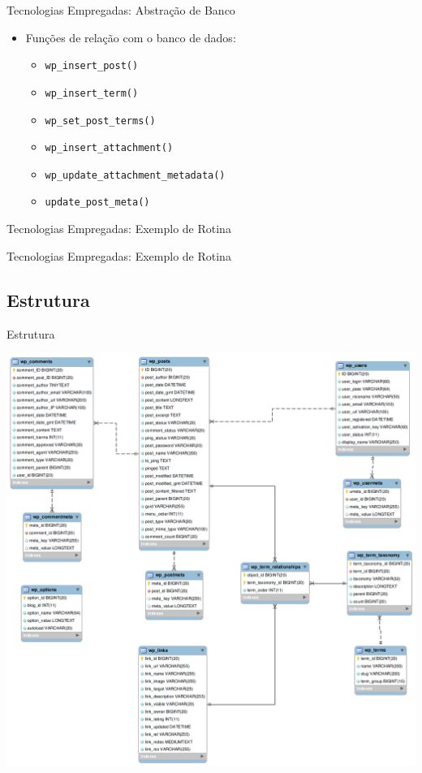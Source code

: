 \documentclass{beamer}
\begin{document}
\begin{frame}{Tecnologias Empregadas: Abstração de Banco}
    \begin{itemize}
    \pause \item Funções de relação com o banco de dados:
    \begin{itemize}
      \pause \item \texttt{wp\_insert\_post()}
      \pause \item \texttt{wp\_insert\_term()}
      \pause \item \texttt{wp\_set\_post\_terms()}
      \pause \item \texttt{wp\_insert\_attachment()}
      \pause \item \texttt{wp\_update\_attachment\_metadata()}
      \pause \item \texttt{update\_post\_meta()}
    \end{itemize}
  \end{itemize}
\end{frame}

\begin{frame}{Tecnologias Empregadas: Exemplo de Rotina}
  
\end{frame}

\begin{frame}{Tecnologias Empregadas: Exemplo de Rotina}
  
\end{frame}

\subsection{Estrutura}

\begin{frame}{Estrutura}
  \begin{center}
    \pause \includegraphics[height=0.8\textheight]{./img/wp-tables.png}
  \end{center}
\end{frame}
\end{document}
